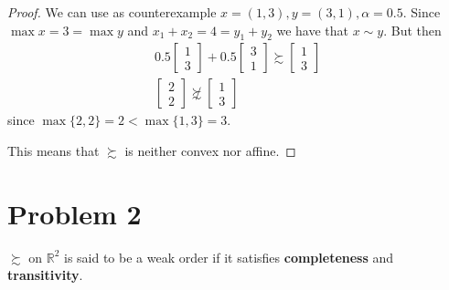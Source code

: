 \documentclass[12pt]{extarticle}
\numberwithin{table}{section}
\numberwithin{figure}{section}
\numberwithin{equation}{section}
\begin{document}
\begin{enumerate}[label=\alph*.)]
          \begin{proof}
              We can use as counterexample $x = (1, 3), y = (3, 1), \alpha = 0.5$.
              Since $\max x = 3 = \max y$ and $x_1 + x_2 = 4 = y_1 + y_2$ we have that $x \sim y$.
              But then
              \begin{gather}
                  0.5 \begin{bmatrix}1 \\ 3\end{bmatrix} + 0.5 \begin{bmatrix}3 \\ 1\end{bmatrix} \succsim \begin{bmatrix}1 \\ 3\end{bmatrix} \\
                  \begin{bmatrix}2 \\ 2\end{bmatrix} \not \succsim \begin{bmatrix}1 \\ 3\end{bmatrix}
              \end{gather}
              since $\max\{2,2\} = 2 < \max\{ 1, 3 \} = 3$.

              This means that $\succsim$ is neither convex nor affine.
          \end{proof}
\end{enumerate}

\section{Problem 2}
$\succsim$ on $\mathbb{R}^2$ is said to be a weak order if it satisfies \textbf{completeness} and \textbf{transitivity}.
\end{document}
